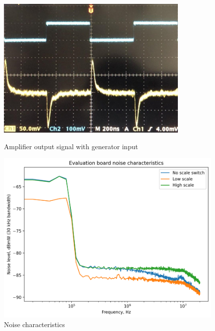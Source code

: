 \documentclass[a4paper]{jpconf}
\begin{document}
\begin{figure}[htbp]
	\begin{minipage}{18pc}
		\includegraphics[width=\textwidth]{osc.png}
		\caption{\label{fig:9} Amplifier output signal with generator input}
	\end{minipage}\hspace{2pc}
	\begin{minipage}{18pc}
		\includegraphics[width=\textwidth]{noise.png}
		\caption{\label{fig:10} Noise characteristics}
	\end{minipage} 
\end{figure}
\end{document}

